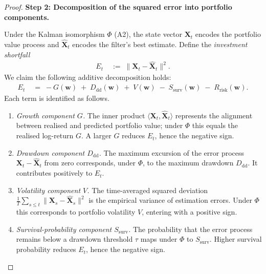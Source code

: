 \documentclass[12pt,openany]{book}
\numberwithin{equation}{chapter}
\theoremstyle{plain}
\theoremstyle{definition}
\theoremstyle{remark}
\def\mathcal#1{#1}%
\begin{document}
\begin{proof}
\medskip
\noindent\textbf{Step 2: Decomposition of the squared error
into portfolio components.}

Under the Kalman isomorphism $\Phi$ (A2), the state vector
$\mathbf{X}_t$ encodes the portfolio value process and
$\hat{\mathbf{X}}_t$ encodes the filter's best estimate.
Define the \emph{investment shortfall}
\begin{align}
  \mathcal{E}_t
  &\;:=\;
  \bigl\|\mathbf{X}_t - \hat{\mathbf{X}}_t\bigr\|^2.
  \label{eq:shortfall-def}
\end{align}
We claim the following additive decomposition holds:
\begin{align}
  \mathcal{E}_t
  &\;=\;
  -G(\mathbf{w})
  \;+\; D_{\mathrm{dd}}(\mathbf{w})
  \;+\; V(\mathbf{w})
  \;-\; S_{\mathrm{surv}}(\mathbf{w})
  \;-\; R_{\mathrm{risk}}(\mathbf{w}).
  \label{eq:shortfall-decomp}
\end{align}
Each term is identified as follows.

\begin{enumerate}
  \item \emph{Growth component $G$.}
        The inner product
        $\langle \mathbf{X}_t, \hat{\mathbf{X}}_t\rangle$
        represents the alignment between realised and predicted
        portfolio value; under $\Phi$ this equals the realised
        log-return $G$.  A larger $G$ reduces $\mathcal{E}_t$,
        hence the negative sign.

  \item \emph{Drawdown component $D_{\mathrm{dd}}$.}
        The maximum excursion of the error process
        $\mathbf{X}_t - \hat{\mathbf{X}}_t$ from zero corresponds,
        under $\Phi$, to the maximum drawdown $D_{\mathrm{dd}}$.
        It contributes positively to $\mathcal{E}_t$.

  \item \emph{Volatility component $V$.}
        The time-averaged squared deviation
        $\frac{1}{T}\sum_{s\le t}\|\mathbf{X}_s
        - \hat{\mathbf{X}}_s\|^2$ is the empirical variance of
        estimation errors.  Under $\Phi$ this corresponds to
        portfolio volatility $V$, entering with a positive sign.

  \item \emph{Survival-probability component $S_{\mathrm{surv}}$.}
        The probability that the error process remains below a
        drawdown threshold $\tau$ maps under $\Phi$ to
        $S_{\mathrm{surv}}$.  Higher survival probability
        reduces $\mathcal{E}_t$, hence the negative sign.


\end{enumerate}
\end{proof}
\end{document}

